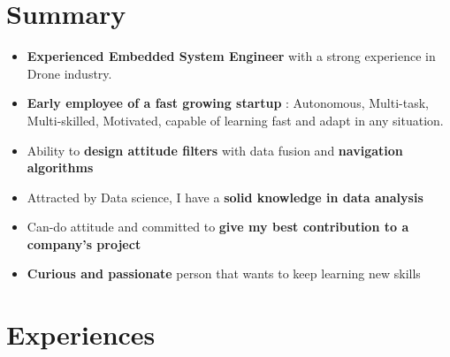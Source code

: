 \documentclass[a4paper]{friggeri-cv} %
\begin{document}
\section{Summary}
\begin{itemize}
\item \textbf{Experienced Embedded System Engineer} with a strong experience in Drone industry.
\item \textbf{Early employee of a fast growing startup} : Autonomous, Multi-task, Multi-skilled, Motivated, capable of learning fast and adapt in any situation.
\item Ability to \textbf{design attitude filters} with data fusion and \textbf{navigation algorithms}
\item Attracted by Data science, I have a \textbf{solid knowledge in data analysis}
\item Can-do attitude and committed to \textbf{give my best contribution to a company's project}%
\item \textbf{Curious and passionate} person that wants to keep learning new skills\\
\end{itemize}



\section{Experiences}
\end{document}
